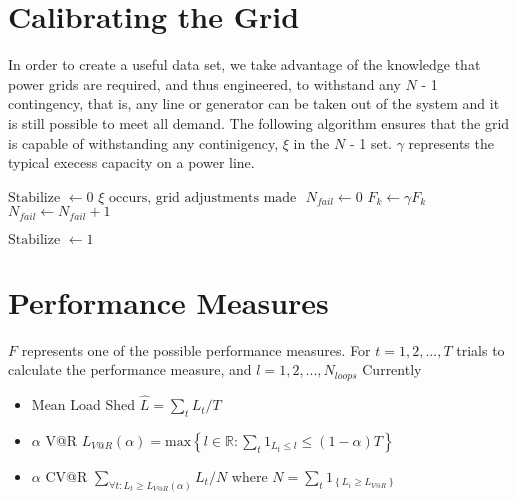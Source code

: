 \section{Calibrating the Grid}\label{calibrate}
In order to create a useful data set, we take advantage of the knowledge that power grids are required, and thus engineered, to withstand any $N$ - 1 contingency, that is, any line or generator can be taken out of the system and it is still possible to meet all demand.  The following algorithm ensures that the grid is capable of withstanding any continigency, $\xi$ in the $N$ - 1 set. $\gamma$ represents the typical execess capacity on a power line.\newline

\begin{algorithmic}
\STATE $ \mbox{Stabilize } \gets 0 $
\STATE $ \xi \mbox{ occurs, grid adjustments made } $
	\STATE $N_{fail} \gets 0$
				\STATE $ F_k \gets \gamma F_k $
				\STATE $N_{fail} \gets N_{fail} + 1 $
		\ENDIF  
	\ENDFOR
	
				\STATE $ \mbox{Stabilize } \gets 1 $
		\ENDIF


\ENDWHILE

\end{algorithmic}

\section{Performance Measures}\label{pm}
$F$ represents one of the possible performance measures.  \newline
For $t=1,2,...,T$ trials to calculate the performance measure, and $l=1,2,...,N_{loops}$ \newline
Currently
\begin{itemize}
\item Mean Load Shed \newline
$\hat{L} = \sum_t L_t / T $
\item $\alpha$ V@R \newline
   $L_{V@R} (\alpha) =  \mbox{max} \left\{ l \in \mathbb{R} : \sum_t 1_{L_t \leq l } \leq \left( 1 - \alpha \right) T \right\}$
\item $\alpha$ CV@R \newline
  $ \sum_{\forall t: L_t \geq L_{V@R}(\alpha)}  L_t / N$ where $N = \sum_t 1_{ \left\{ L_i \geq L_{V@R} \right\}}$

	
\end{itemize}


